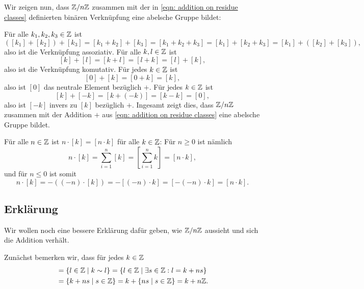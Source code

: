 Wir zeigen nun, dass $\mathbb{Z}/n\mathbb{Z}$ zusammen mit der in \eqref{eqn: addition on residue classes} definierten binären Verknüpfung eine abelsche Gruppe bildet:

Für alle $k_1, k_2, k_3 \in \mathbb{Z}$ ist
\[
 ([k_1] + [k_2]) + [k_3]
 = [k_1 + k_2] + [k_3]
 = [k_1 + k_2 + k_3]
 = [k_1] + [k_2 + k_3]
 = [k_1] + ([k_2] + [k_3]),
\]
also ist die Verknüpfung assoziativ. Für alle $k,l \in \mathbb{Z}$ ist
\[
 [k] + [l] = [k+l] = [l+k] = [l] + [k],
\]
also ist die Verknüpfung komutativ. Für jedes $k \in \mathbb{Z}$ ist
\[
 [0] + [k] = [0 + k] = [k],
\]
also ist $[0]$ das neutrale Element bezüglich $+$. Für jedes $k \in \mathbb{Z}$ ist
\[
 [k] + [-k] = [k+(-k)] = [k-k] = [0],
\]
also ist $[-k]$ invers zu $[k]$ bezüglich $+$. Ingesamt zeigt dies, dass $\mathbb{Z}/n\mathbb{Z}$ zusammen mit der Addition $+$ aus \eqref{eqn: addition on residue classes} eine abelsche Gruppe bildet.


\begin{bem}\label{bem: rules for ZnZ}
 Für alle $n \in \mathbb{Z}$ ist $n \cdot [k] = [n \cdot k]$ für alle $k \in \mathbb{Z}$: Für $n \geq 0$ ist nämlich
 \[
  n \cdot [k]
  = \sum_{i=1}^n [k]
  = \left[ \sum_{i=1}^n k \right]
  = [n \cdot k],
 \]
 und für $n \leq 0$ ist somit
 \[
  n \cdot [k]
  = - ((-n) \cdot [k])
  = - [(-n) \cdot k]
  = [- (-n) \cdot k]
  = [n \cdot k].
 \]
\end{bem}



\subsection{Erklärung}
Wir wollen noch eine bessere Erklärung dafür geben, wie $\mathbb{Z}/n\mathbb{Z}$ aussieht und sich die Addition verhält.

Zunächst bemerken wir, dass für jedes $k \in \mathbb{Z}$
\begin{align*}
 [k]
 &= \{l \in \Zbb \mid k \sim l\}
 = \{l \in \Zbb \mid \exists s \in \Zbb : l = k + ns\} \\
 &= \{k + ns \mid s \in \Zbb\}
 = k + \{ns \mid s \in \Zbb\}
 = k + n\Zbb.
\end{align*}

